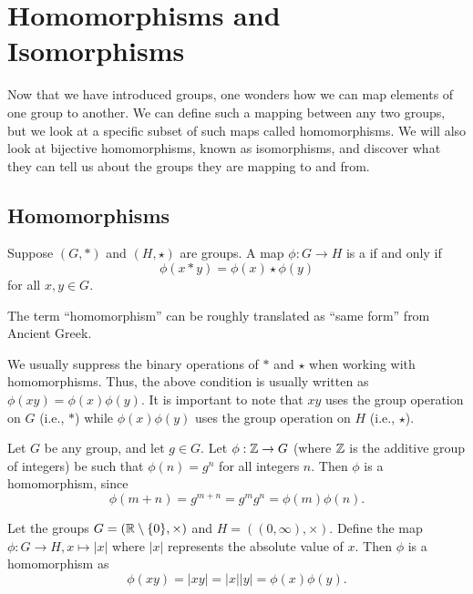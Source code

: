 \chapter{Homomorphisms and Isomorphisms}
Now that we have introduced groups, one wonders how we can map elements of one group to another. We can define such a mapping between any two groups, but we look at a specific subset of such maps called homomorphisms. We will also look at bijective homomorphisms, known as isomorphisms, and discover what they can tell us about the groups they are mapping to and from.

\section{Homomorphisms}
\begin{definition}
    Suppose $(G, \ast)$ and $(H, \star)$ are groups. A map $\phi: G \to H$ is a  if and only if
    \[
        \phi(x \ast y) = \phi(x) \star \phi(y)
    \]
    for all $x, y \in G$.
\end{definition}
\begin{remark}
    The term ``homomorphism'' can be roughly translated as ``same form'' from Ancient Greek.
\end{remark}
\begin{remark}
    We usually suppress the binary operations of $\ast$ and $\star$ when working with homomorphisms. Thus, the above condition is usually written as $\phi(xy) = \phi(x)\phi(y)$. It is important to note that $xy$ uses the group operation on $G$ (i.e., $\ast$) while $\phi(x)\phi(y)$ uses the group operation on $H$ (i.e., $\star$).
\end{remark}

\begin{example}
    Let $G$ be any group, and let $g \in G$. Let $\phi: \mathbb{Z} \to G$ (where $\mathbb{Z}$ is the additive group of integers) be such that $\phi(n) = g^n$ for all integers $n$. Then $\phi$ is a homomorphism, since
    \[
        \phi(m + n) = g^{m+n} = g^m g^n = \phi(m)\phi(n).
    \]
\end{example}

\begin{example}
    Let the groups $G = (\mathbb{R} \setminus \{0\}, \times)$ and $H = ((0,\infty),\times)$. Define the map $\phi: G \to H, x \mapsto |x|$ where $|x|$ represents the absolute value of $x$. Then $\phi$ is a homomorphism as
    \[
        \phi(xy) = |xy| = |x||y| = \phi(x)\phi(y).
    \]
\end{example}

